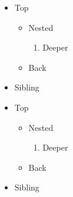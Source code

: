\begin{frame}[t]
\begin{itemize}
\item Top
\begin{itemize}
\item Nested
\begin{enumerate}
\item Deeper
\end{enumerate}
\item Back
\end{itemize}
\item Sibling
\end{itemize}
\end{frame}

\begin{frame}[t]
\begin{itemize}
\item Top
\begin{itemize}
\item Nested
\begin{enumerate}
\item Deeper
\end{enumerate}
\item Back
\end{itemize}
\item Sibling
\end{itemize}
\end{frame}

